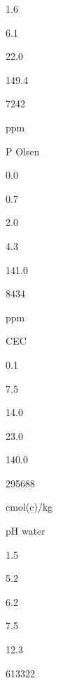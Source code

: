 \documentclass[
  10pt,
  b5paper,
  oneside]{book}
\begin{document}
1.6

6.1

22.0

149.4

7242

ppm

P Olsen

0.0

0.7

2.0

4.3

141.0

8434

ppm

CEC

0.1

7.5

14.0

23.0

140.0

295688

cmol(c)/kg

pH water

1.5

5.2

6.2

7.5

12.3

613322
\end{document}

